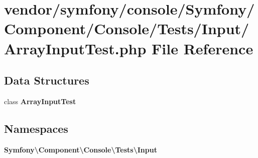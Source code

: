 \section{vendor/symfony/console/\+Symfony/\+Component/\+Console/\+Tests/\+Input/\+Array\+Input\+Test.php File Reference}
\label{_array_input_test_8php}
\subsection*{Data Structures}
\begin{DoxyCompactItemize}
\item 
class {\bf Array\+Input\+Test}
\end{DoxyCompactItemize}
\subsection*{Namespaces}
\begin{DoxyCompactItemize}
\item 
 {\bf Symfony\textbackslash{}\+Component\textbackslash{}\+Console\textbackslash{}\+Tests\textbackslash{}\+Input}
\end{DoxyCompactItemize}
